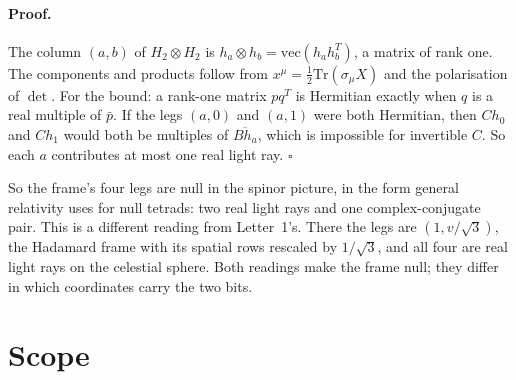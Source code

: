 \documentclass[twocolumn]{iopjournal}
\begin{document}
\paragraph{Proof.} The column $(a, b)$ of $H_2 \otimes H_2$ is
$h_a \otimes h_b = \mathrm{vec}(h_a h_b^T)$, a matrix of rank one.
The components and products follow from
$x^\mu = \tfrac12\mathrm{Tr}(\sigma_\mu X)$ and the polarisation of
$\det$. For the bound: a rank-one matrix $pq^T$ is Hermitian exactly
when $q$ is a real multiple of $\bar p$. If the legs $(a,0)$ and
$(a,1)$ were both Hermitian, then $Ch_0$ and $Ch_1$ would both be
multiples of $\overline{Bh_a}$, which is impossible for invertible
$C$. So each $a$ contributes at most one real light ray.
\hfill $\square$

\medskip
\noindent
So the frame's four legs are null in the spinor picture, in the form
general relativity uses for null tetrads: two real light rays and one
complex-conjugate pair. This is a different reading from Letter~1's.
There the legs are $(1, v/\sqrt3)$, the Hadamard frame with its
spatial rows rescaled by $1/\sqrt3$, and all four are real light rays
on the celestial sphere. Both readings make the frame null; they
differ in which coordinates carry the two bits.


\section*{Scope}
\end{document}
